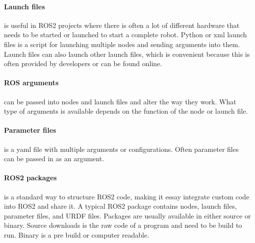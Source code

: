 \paragraph{Launch files} is useful in ROS2 projects where there is often a lot of different hardware that needs to be started or launched to start a complete robot. Python or xml launch files is a script for launching multiple nodes and sending arguments into them. Launch files can also launch other launch files, which is convenient because this is often provided by developers or can be found online. 

\paragraph{ROS arguments} can be passed into nodes and launch files and alter the way they work. What type of arguments is available depends on the function of the node or launch file.  

\paragraph{Parameter files} is a yaml file with multiple arguments or configurations. Often parameter files can be passed in as an argument.

\paragraph{ROS2 packages} is a standard way to structure ROS2 code, making it essay integrate custom code into ROS2 and share it. A typical ROS2 package contains nodes, launch files, parameter files, and URDF files. Packages are usually available in either source or binary. Source downloads is the raw code of a program and need to be build to run. Binary is a pre build or computer readable. 

